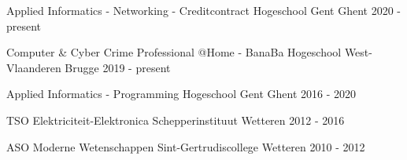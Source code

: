 

\begin{cventries}
	
\cventry
{Applied Informatics - Networking - Creditcontract} %
{Hogeschool Gent} %
{Ghent} %
{2020 - present} %
{
}

\cventry
{Computer \& Cyber Crime Professional @Home - BanaBa} %
{Hogeschool West-Vlaanderen} %
{Brugge} %
{2019 - present} %
{
}

\cventry
{Applied Informatics - Programming} %
{Hogeschool Gent} %
{Ghent} %
{2016 - 2020} %
{
}

\cventry
{TSO Elektriciteit-Elektronica} %
{Schepperinstituut} %
{Wetteren} %
{2012 - 2016} %
{
}

  \cventry
    {ASO Moderne Wetenschappen} %
    {Sint-Gertrudiscollege} %
    {Wetteren} %
    {2010 - 2012} %
    {
    }

\end{cventries}
